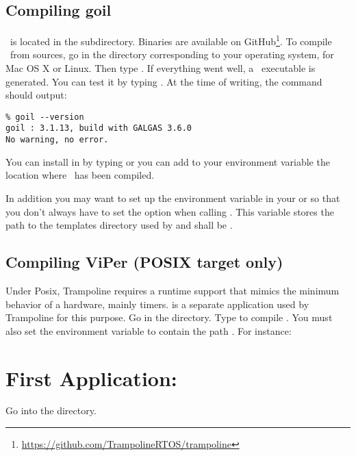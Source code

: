 \subsection{Compiling goil}

\goil\ is located in the  subdirectory. Binaries are available on GitHub\footnote{\url{https://github.com/TrampolineRTOS/trampoline}}. To compile \goil\ from sources, go in the directory corresponding to your operating system,  for Mac OS X or Linux. Then type . If everything went well, a \goil\ executable is generated. You can test it by typing . At the time of writing, the command should output:

\begin{verbatim}
% goil --version
goil : 3.1.13, build with GALGAS 3.6.0
No warning, no error.
\end{verbatim}

You can install  in  by typing  or you can add to your  environment variable the location where \goil\ has been compiled.

In addition you may want to set up the  environment variable in your  or  so that you don't always have to set the  option when calling . This variable stores the path to the templates directory used by  and shall be .

\subsection{Compiling ViPer (POSIX target only)}

Under Posix, Trampoline requires a runtime support that mimics the minimum behavior of a hardware, mainly timers.  is a separate application used by Trampoline for this purpose. Go in the  directory. Type  to compile . You must also set the environment variable  to contain the path . For instance: 

\section{First Application: }

Go into the  directory.

